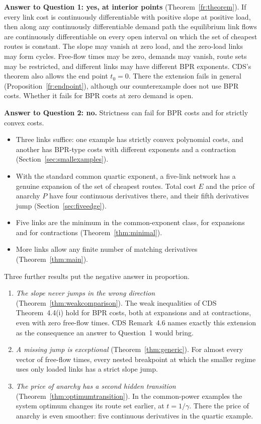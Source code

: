 \textbf{Answer to Question 1: yes, at interior points} (Theorem~\ref{fr:theorem}). If every link cost is continuously differentiable with positive slope at positive load, then along any continuously differentiable demand path the equilibrium link flows are continuously differentiable on every open interval on which the set of cheapest routes is constant. The slope may vanish at zero load, and the zero-load links may form cycles. Free-flow times may be zero, demands may vanish, route sets may be restricted, and different links may have different BPR exponents. CDS's theorem also allows the end point $t_0=0$. There the extension fails in general (Proposition~\ref{fr:endpoint}), although our counterexample does not use BPR costs. Whether it fails for BPR costs at zero demand is open.

\textbf{Answer to Question 2: no.} Strictness can fail for BPR costs and for strictly convex costs.
\begin{itemize}[nosep]
\item Three links suffice: one example has strictly convex polynomial costs, and another has BPR-type costs with different exponents and a contraction (Section~\ref{sec:smallexamples}).
\item With the standard common quartic exponent, a five-link network has a genuine expansion of the set of cheapest routes. Total cost $E$ and the price of anarchy $P$ have four continuous derivatives there, and their fifth derivatives jump (Section~\ref{sec:fiveedge}).
\item Five links are the minimum in the common-exponent class, for expansions and for contractions (Theorem~\ref{thm:minimal}).
\item More links allow any finite number of matching derivatives (Theorem~\ref{thm:main}).
\end{itemize}

Three further results put the negative answer in proportion.
\begin{enumerate}[nosep]
\item \emph{The slope never jumps in the wrong direction} (Theorem~\ref{thm:weakcomparison}). The weak inequalities of CDS Theorem~4.4(i) hold for BPR costs, both at expansions and at contractions, even with zero free-flow times. CDS Remark~4.6 names exactly this extension as the consequence an answer to Question~1 would bring.
\item \emph{A missing jump is exceptional} (Theorem~\ref{thm:generic}). For almost every vector of free-flow times, every nested breakpoint at which the smaller regime uses only loaded links has a strict slope jump.
\item \emph{The price of anarchy has a second hidden transition} (Theorem~\ref{thm:optimumtransition}). In the common-power examples the system optimum changes its route set earlier, at $t=1/\gamma$. There the price of anarchy is even smoother: five continuous derivatives in the quartic example.
\end{enumerate}

